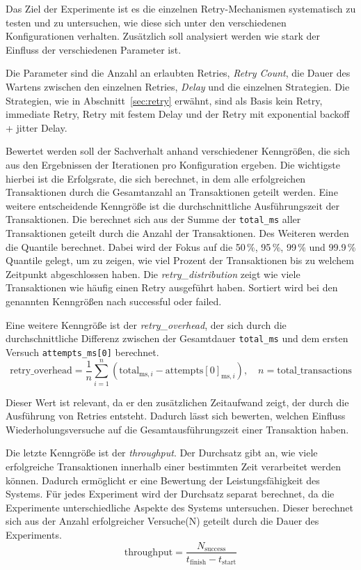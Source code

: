 
Das Ziel der Experimente ist es die einzelnen Retry-Mechanismen systematisch zu testen und zu untersuchen, wie
diese sich unter den verschiedenen Konfigurationen verhalten.
Zusätzlich soll analysiert werden wie stark der Einfluss der verschiedenen Parameter ist.

Die Parameter sind die Anzahl an erlaubten Retries, \emph{Retry Count}, die Dauer des Wartens zwischen den einzelnen
Retries, \emph{Delay} und die einzelnen Strategien.
Die Strategien, wie in Abschnitt~\ref{sec:retry} erwähnt, sind als Basis kein Retry, immediate Retry, Retry mit festem
Delay und der Retry mit exponential backoff + jitter Delay.

Bewertet werden soll der Sachverhalt anhand verschiedener Kenngrößen, die sich aus den Ergebnissen der Iterationen pro
Konfiguration ergeben.
Die wichtigste hierbei ist die Erfolgsrate, die sich berechnet, in dem alle erfolgreichen Transaktionen durch die
Gesamtanzahl an Transaktionen geteilt werden.
Eine weitere entscheidende Kenngröße ist die durchschnittliche Ausführungszeit der Transaktionen.
Die berechnet sich aus der Summe der \texttt{total\_ms} aller Transaktionen geteilt durch die Anzahl der Transaktionen.
Des Weiteren werden die Quantile berechnet.
Dabei wird der Fokus auf die 50\,\%, 95\,\%, 99\,\% und 99.9\,\% Quantile gelegt, um zu zeigen, wie viel Prozent der
Transaktionen bis zu welchem Zeitpunkt abgeschlossen haben.
Die \emph{retry\_distribution} zeigt wie viele Transaktionen wie häufig einen Retry ausgeführt haben.
Sortiert wird bei den genannten Kenngrößen nach successful oder failed.

Eine weitere Kenngröße ist der \emph{retry\_overhead}, der sich durch die durchschnittliche Differenz zwischen der
Gesamtdauer \texttt{total\_ms} und dem ersten Versuch \texttt{attempts\_ms[0]} berechnet.
\[
	\mathrm{retry\_overhead} =
	\frac{1}{n}
	\sum_{i=1}^{n}
	\left(
		\mathrm{total}_{\mathrm{ms},i}
		-
		\mathrm{attempts[0]}_{\mathrm{ms},i}
	\right),
	\quad n = \mathrm{total\_transactions}
\]

Dieser Wert ist relevant, da er den zusätzlichen Zeitaufwand zeigt, der durch die Ausführung von Retries
entsteht.
Dadurch lässt sich bewerten, welchen Einfluss Wiederholungsversuche auf die Gesamtausführungszeit einer Transaktion
haben.

Die letzte Kenngröße ist der \emph{throughput}.
Der Durchsatz gibt an, wie viele erfolgreiche Transaktionen innerhalb einer bestimmten Zeit verarbeitet werden
können.
Dadurch ermöglicht er eine Bewertung der Leistungsfähigkeit des Systems.
Für jedes Experiment wird der Durchsatz separat berechnet, da die Experimente unterschiedliche Aspekte des Systems
untersuchen.
Dieser berechnet sich aus der Anzahl erfolgreicher Versuche(N) geteilt durch die Dauer des Experiments.
\[
	\mathrm{throughput} =
	\frac{
		N_{\mathrm{success}}
	}{
		t_{\mathrm{finish}}-t_{\mathrm{start}}
	}
\]

